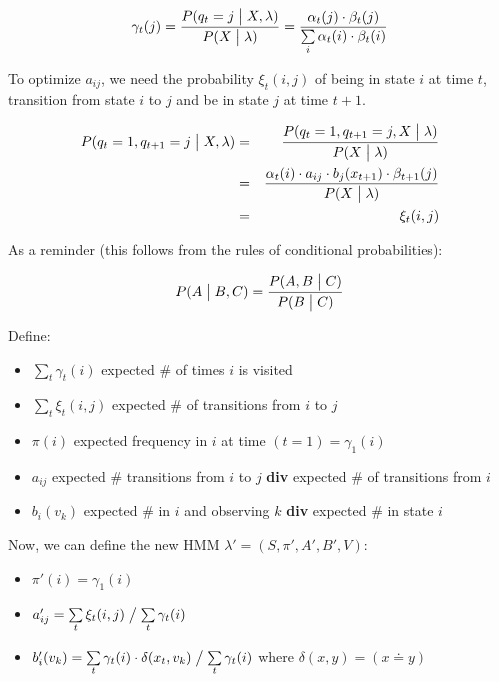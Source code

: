 \documentclass[11pt]{article}
\begin{document}
\begin{equation}
    \gamma_t(j) = \frac{P(q_t = j \bigm| X, \lambda)}{P(X \bigm| \lambda)} = \frac{\alpha_t(j) \cdot \beta_t(j)}{\sum\limits_i \alpha_t(i) \cdot \beta_t(i)}
\end{equation}

To optimize $a_{ij}$, we need the probability $\xi_t(i, j)$ of being in state $i$ at time $t$, transition from state $i$ to $j$ and be in state $j$ at time $t+1$.

\begin{eqnarray*}
    P(q_t = 1, q_{t+1} = j \bigm| X, \lambda) &=& \frac{P(q_t = 1, q_{t+1} = j, X \bigm| \lambda)}{P(X \bigm| \lambda)} \\
                                              &=& \frac{\alpha_t(i) \cdot a_{ij} \cdot b_j(x_{t+1}) \cdot \beta_{t+1}(j)}{P(X \bigm| \lambda)} \\
                                              &=& \xi_t(i, j)
\end{eqnarray*}

As a reminder (this follows from the rules of conditional probabilities):

\begin{equation}
    P(A \bigm| B, C) = \frac{P(A, B \bigm| C)}{P(B \bigm| C)}
\end{equation}

Define:
\begin{itemize}
    \item $\sum\limits_t \gamma_t(i)$ expected \# of times $i$ is visited
    \item $\sum\limits_t \xi_t(i, j)$ expected \# of transitions from $i$ to $j$
    \item $\pi(i)$ expected frequency in $i$ at time $(t = 1) = \gamma_1(i)$
    \item $a_{ij}$ expected \# transitions from $i$ to $j$ \textbf{div} expected \# of transitions from $i$
    \item $b_i(v_k)$ expected \# in $i$ and observing $k$ \textbf{div} expected \# in state $i$
\end{itemize}

Now, we can define the new HMM $\lambda' = (S, \pi', A', B', V)$:
\begin{itemize}
    \item $\pi'(i) = \gamma_1(i)$
    \item $a'_{ij} = \sum\limits_t \xi_t(i, j) \bigm/ \sum\limits_t \gamma_t(i)$
    \item $b'_i(v_k) = \sum\limits_t \gamma_t(i) \cdot \delta(x_t, v_k) \bigm/ \sum\limits_t \gamma_t(i)$ where $\delta(x, y) = (x \doteq y)$
\end{itemize}
\end{document}
